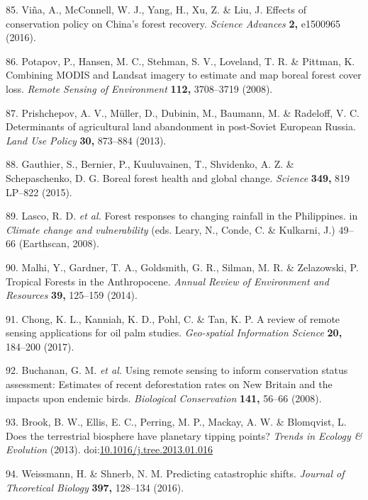 \documentclass[]{article}
\begin{document}
\hypertarget{ref-Vina2016}{}
85. Viña, A., McConnell, W. J., Yang, H., Xu, Z. \& Liu, J. Effects of
conservation policy on China's forest recovery. \emph{Science Advances}
\textbf{2,} e1500965 (2016).

\hypertarget{ref-Potapov2008a}{}
86. Potapov, P., Hansen, M. C., Stehman, S. V., Loveland, T. R. \&
Pittman, K. Combining MODIS and Landsat imagery to estimate and map
boreal forest cover loss. \emph{Remote Sensing of Environment}
\textbf{112,} 3708--3719 (2008).

\hypertarget{ref-Prishchepov2013}{}
87. Prishchepov, A. V., Müller, D., Dubinin, M., Baumann, M. \&
Radeloff, V. C. Determinants of agricultural land abandonment in
post-Soviet European Russia. \emph{Land Use Policy} \textbf{30,}
873--884 (2013).

\hypertarget{ref-Gauthier2015}{}
88. Gauthier, S., Bernier, P., Kuuluvainen, T., Shvidenko, A. Z. \&
Schepaschenko, D. G. Boreal forest health and global change.
\emph{Science} \textbf{349,} 819 LP--822 (2015).

\hypertarget{ref-Lasco2008}{}
89. Lasco, R. D. \emph{et al.} Forest responses to changing rainfall in
the Philippines. in \emph{Climate change and vulnerability} (eds. Leary,
N., Conde, C. \& Kulkarni, J.) 49--66 (Earthscan, 2008).

\hypertarget{ref-Malhi2014}{}
90. Malhi, Y., Gardner, T. A., Goldsmith, G. R., Silman, M. R. \&
Zelazowski, P. Tropical Forests in the Anthropocene. \emph{Annual Review
of Environment and Resources} \textbf{39,} 125--159 (2014).

\hypertarget{ref-Chong2017}{}
91. Chong, K. L., Kanniah, K. D., Pohl, C. \& Tan, K. P. A review of
remote sensing applications for oil palm studies. \emph{Geo-spatial
Information Science} \textbf{20,} 184--200 (2017).

\hypertarget{ref-Buchanan2008}{}
92. Buchanan, G. M. \emph{et al.} Using remote sensing to inform
conservation status assessment: Estimates of recent deforestation rates
on New Britain and the impacts upon endemic birds. \emph{Biological
Conservation} \textbf{141,} 56--66 (2008).

\hypertarget{ref-Brook2013}{}
93. Brook, B. W., Ellis, E. C., Perring, M. P., Mackay, A. W. \&
Blomqvist, L. Does the terrestrial biosphere have planetary tipping
points? \emph{Trends in Ecology \& Evolution} (2013).
doi:\href{https://doi.org/10.1016/j.tree.2013.01.016}{10.1016/j.tree.2013.01.016}

\hypertarget{ref-Weissmann2016}{}
94. Weissmann, H. \& Shnerb, N. M. Predicting catastrophic shifts.
\emph{Journal of Theoretical Biology} \textbf{397,} 128--134 (2016).
\end{document}
